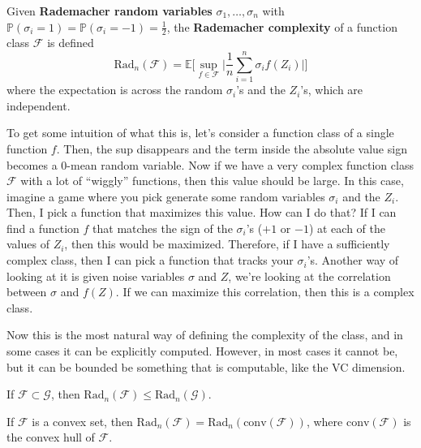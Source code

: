 \documentclass{article}
\begin{document}
    \begin{definition}
      Given \textbf{Rademacher random variables} $\sigma_1, \ldots, \sigma_n$ with $\mathbb{P}(\sigma_i = 1) = \mathbb{P}(\sigma_i = -1) = \frac{1}{2}$, the \textbf{Rademacher complexity} of a function class $\mathcal{F}$ is defined 
      \begin{equation}
        \mathrm{Rad}_n (\mathcal{F}) = \mathbb{E} \bigg[ \sup_{f \in \mathcal{F}} \bigg| \frac{1}{n} \sum_{i=1}^n \sigma_i f(Z_i) \bigg| \bigg]
      \end{equation}
      where the expectation is across the random $\sigma_i$'s and the $Z_i$'s, which are independent. 
    \end{definition}

    To get some intuition of what this is, let's consider a function class of a single function $f$. Then, the sup disappears and the term inside the absolute value sign becomes a $0$-mean random variable. Now if we have a very complex function class $\mathcal{F}$ with a lot of ``wiggly'' functions, then this value should be large. In this case, imagine a game where you pick generate some random variables $\sigma_i$ and the $Z_i$. Then, I pick a function that maximizes this value. How can I do that? If I can find a function $f$ that matches the sign of the $\sigma_i$'s ($+1$ or $-1$) at each of the values of $Z_i$, then this would be maximized. Therefore, if I have a sufficiently complex class, then I can pick a function that tracks your $\sigma_i$'s. Another way of looking at it is given noise variables $\sigma$ and $Z$, we're looking at the correlation between $\sigma$ and $f(Z)$. If we can maximize this correlation, then this is a complex class. 

    Now this is the most natural way of defining the complexity of the class, and in some cases it can be explicitly computed. However, in most cases it cannot be, but it can be bounded be something that is computable, like the VC dimension. 

    \begin{lemma}
      If $\mathcal{F} \subset \mathcal{G}$, then $\mathrm{Rad}_n (\mathcal{F}) \leq \mathrm{Rad}_n (\mathcal{G})$.
    \end{lemma}

    \begin{lemma}
      If $\mathcal{F}$ is a convex set, then $\mathrm{Rad}_n (\mathcal{F}) = \mathrm{Rad}_n (\mathrm{conv}(\mathcal{F}))$, where $\mathrm{conv}(\mathcal{F})$ is the convex hull of $\mathcal{F}$.
    \end{lemma}
\end{document}
